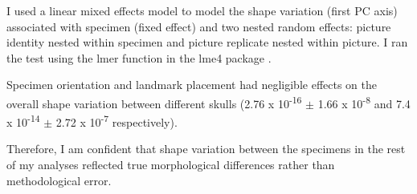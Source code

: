 	I used a linear mixed effects model to model the shape variation (first PC axis) associated with specimen (fixed effect) and two nested random effects: picture identity nested within specimen and picture replicate nested within picture. I ran the test using the lmer function in the lme4 package \citep{Bates2014}. %

	Specimen orientation and landmark placement had negligible effects on the overall shape variation between different skulls (2.76 x 10\textsuperscript{-16} $\pm$ 1.66 x 10\textsuperscript{-8} and 7.4 x 10\textsuperscript{-14} $\pm$ 2.72 x 10\textsuperscript{-7} respectively). %
	
	Therefore, I am confident that shape variation between the specimens in the rest of my analyses reflected true morphological differences rather than methodological error.







